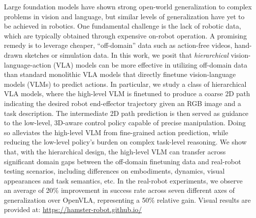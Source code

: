 Large foundation models have shown strong open-world generalization to complex problems in vision and language, but similar levels of generalization have yet to be achieved in robotics. One fundamental challenge is the lack of robotic data, which are typically obtained through expensive on-robot operation. A promising remedy is to leverage cheaper, ``off-domain'' data such as action-free videos, hand-drawn sketches or simulation data. 
In this work, we posit that \emph{hierarchical} vision-language-action (VLA) models can be more effective in utilizing off-domain data than standard monolithic VLA models that directly finetune vision-language models (VLMs) to predict actions. 
In particular, we study a class of hierarchical VLA models, where the high-level VLM is finetuned to produce a coarse 2D path indicating the desired robot end-effector trajectory given an RGB image and a task description. The intermediate 2D path prediction is then served as guidance to the low-level, 3D-aware control policy capable of precise manipulation. Doing so alleviates the high-level VLM from fine-grained action prediction, while reducing the low-level policy's burden on complex task-level reasoning. 
We show that, with the hierarchical design, the high-level VLM can transfer across significant domain gaps between the off-domain finetuning data and real-robot testing scenarios, including differences on embodiments, dynamics, visual appearances and task semantics, etc. 
In the real-robot experiments, we observe an average of 20\% improvement in success rate across seven different axes of generalization over OpenVLA, representing a 50\% relative gain. 
Visual results are
provided at: \url{https://hamster-robot.github.io/}


